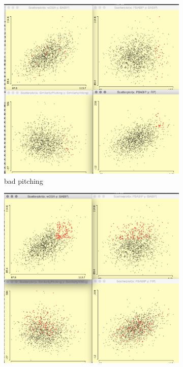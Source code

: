 \documentclass[12pt]{article}
\numberwithin{equation}{subsection}
\begin{document}
\begin{figure}[H] 
  \begin{subfigure}[b]{0.5\linewidth}
    \centering
    \includegraphics[width=0.9\linewidth]{m1} 
    \caption{bad pitching} 
    \label{fig5:a} 
    \vspace{4ex}
  \end{subfigure}%
  \begin{subfigure}[b]{0.5\linewidth}
    \centering
    \includegraphics[width=0.9\linewidth]{m2} 

\end{subfigure}
\end{figure}
\end{document}
